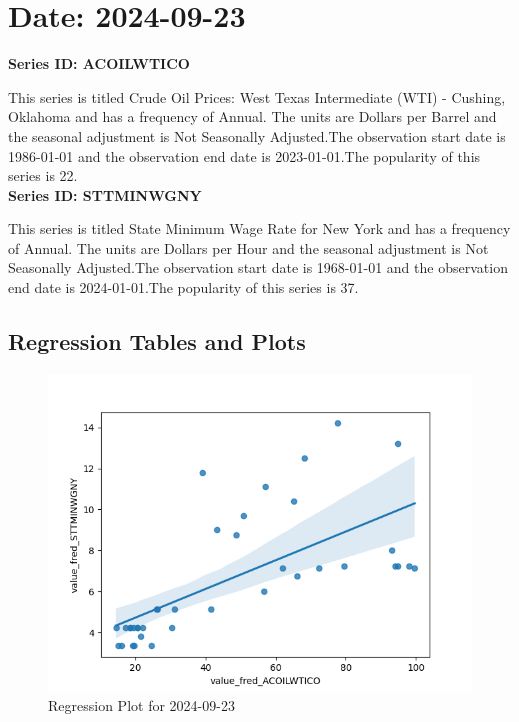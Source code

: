 \section{Date: 2024-09-23}
\noindent \textbf{Series ID: ACOILWTICO} 

\noindent This series is titled Crude Oil Prices: West Texas Intermediate (WTI) - Cushing, Oklahoma and has a frequency of Annual. The units are Dollars per Barrel and the seasonal adjustment is Not Seasonally Adjusted.The observation start date is 1986-01-01 and the observation end date is 2023-01-01.The popularity of this series is 22. \\ 

\noindent \textbf{Series ID: STTMINWGNY} 

\noindent This series is titled State Minimum Wage Rate for New York and has a frequency of Annual. The units are Dollars per Hour and the seasonal adjustment is Not Seasonally Adjusted.The observation start date is 1968-01-01 and the observation end date is 2024-01-01.The popularity of this series is 37. \\ 

\subsection{Regression Tables and Plots}


\begin{figure}
\centering
\includegraphics[scale = 0.9]{plots/plot_2024-09-23.png}
\caption{Regression Plot for 2024-09-23}
\end{figure}
\newpage
